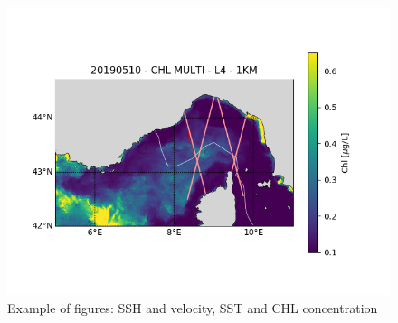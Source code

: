 \documentclass[12pt,a4paper]{article}
\begin{document}
\begin{figure}[h!]
\begin{center}
\includegraphics[scale=0.5]{Figures/d-OC_CNR-L4-CHL-INTERP_MULTI_1KM-MED-NRT.png}
\end{center}
\caption{Example of figures: SSH and velocity, SST and CHL concentration}
\end{figure}



\newpage
\end{document}
